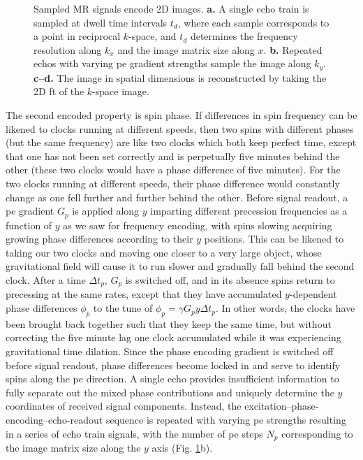 \begin{figure}
  
  \caption[MRI spatial encoding and $k$-space]{Sampled MR signals encode 2D images.
  \textbf{\sffamily a.} A single echo train is sampled at dwell time intervals $t_d$, where each sample corresponds to a point in reciprocal $k$-space, and $t_d$ determines the frequency resolution along $k_x$ and the image matrix size along $x$.
  \textbf{\sffamily b.} Repeated echos with varying \gls{pe} gradient strengths sample the image along $k_y$.
  \textbf{\sffamily c--d.} The image in spatial dimensions is reconstructed by taking the 2D \gls{ft} of the $k$-space image.}
  \label{fig:kspace}
\end{figure}

The second encoded property is spin phase.
If differences in spin frequency can be likened to clocks running at different speeds, then two spins with different phases (but the same frequency) are like two clocks which both keep perfect time, except that one has not been set correctly and is perpetually five minutes behind the other (these two clocks would have a phase difference of five minutes).
For the two clocks running at different speeds, their phase difference would constantly change as one fell further and further behind the other.
Before signal readout, a \gls{pe} gradient $G_p$ is applied along $y$ imparting different precession frequencies as a function of $y$ as we saw for frequency encoding, with spins slowing acquiring growing phase differences according to their $y$ positions.
This can be likened to taking our two clocks and moving one closer to a very large object, whose gravitational field will cause it to run slower and gradually fall behind the second clock.
After a time $\Delta t_p$, $G_p$ is switched off, and in its absence spins return to precessing at the same rates, except that they have accumulated $y$-dependent phase differences $\phi_p$ to the tune of $\phi_p=\gamma G_p y \Delta t_p$.
In other words, the clocks have been brought back together such that they keep the same time, but without correcting the five minute lag one clock accumulated while it was experiencing gravitational time dilation.
Since the phase encoding gradient is switched off before signal readout, phase differences become locked in and serve to identify spins along the \gls{pe} direction.
A single echo provides insufficient information to fully separate out the mixed phase contributions and uniquely determine the $y$ coordinates of received signal components.
Instead, the excitation--phase-encoding--echo-readout sequence is repeated with varying \gls{pe} strengths resulting in a series of echo train signals, with the number of \gls{pe} steps $N_{p}$ corresponding to the image matrix size along the $y$ axis (Fig. \ref{fig:kspace}b).

